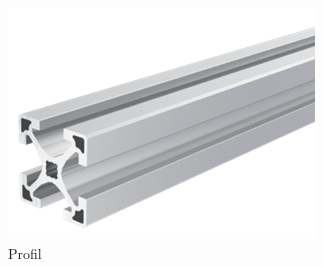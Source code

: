\begin{figure}[H]
    \centering
    \begin{subfigure}[b]{0.4\textwidth}
        \centering
        \includegraphics[width=\textwidth]{image/profil.png}
        \caption{Profil}
        \label{fig:bild1}
    \end{subfigure}
    \hfill
    \begin{subfigure}[b]{0.2\textwidth}
        \centering

\end{subfigure}
\end{figure}
